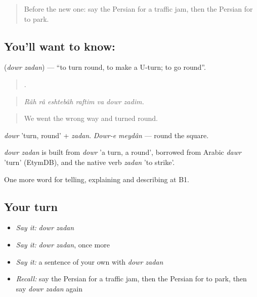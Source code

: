 \label{lesson:FA-C426-dor-zadan}



\begin{quote}
Before the new one: say the Persian for a traffic jam, then the Persian for to park.
\end{quote}

\subsection*{You'll want to know:  }
\textbf{ } (\emph{dowr zadan}) — \textquotedblleft{}to turn round, to make a U-turn; to go round\textquotedblright{}.

\begin{quote}
      .
\end{quote}

\begin{quote}
\emph{Râh râ eshtebâh raftim va dowr zadim.}
\end{quote}

\begin{quote}
We went the wrong way and turned round.
\end{quote}

\emph{dowr} 'turn, round' + \emph{zadan}. \emph{Dowr-e meydân} — round the square.

\begin{cousinweb}
\emph{dowr zadan} is built from \emph{dowr} 'a turn, a round', borrowed from Arabic \emph{dawr} 'turn' (EtymDB), and the native verb \emph{zadan} 'to strike'.
\end{cousinweb}

\begin{grammarlens}[title={What you've built}]
One more word for telling, explaining and describing at B1.
\end{grammarlens}

\subsection*{Your turn}
\begin{itemize}
\raggedright
  \item \emph{Say it:} \emph{dowr zadan}
  \item \emph{Say it:} \emph{dowr zadan}, once more
  \item \emph{Say it:} a sentence of your own with \emph{dowr zadan}
  \item \emph{Recall:} say the Persian for a traffic jam, then the Persian for to park, then say \emph{dowr zadan} again
\end{itemize}

